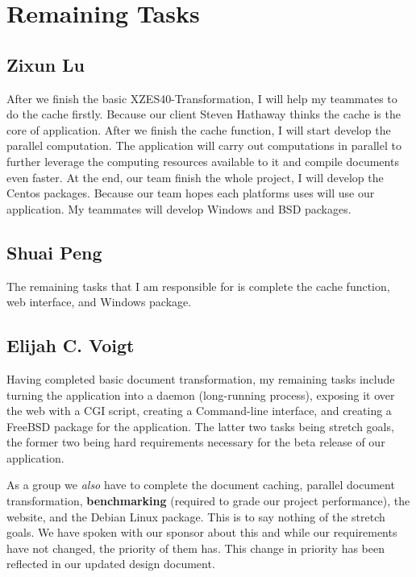 \section{Remaining Tasks}

\subsection{Zixun Lu}

After we finish the basic XZES40-Transformation, I will help my teammates to do the cache firstly. 
Because our client Steven Hathaway thinks the cache is the core of application. 
After we finish the cache function, I will start develop the parallel computation. 
The application will carry out computations in parallel to further leverage the computing resources available to it and compile documents even faster. 
At the end, our team finish the whole project, I will develop the Centos packages.
Because our team hopes each platforms uses will use our application.
My teammates will develop Windows and BSD packages.

\subsection{Shuai Peng}

The remaining tasks that I am responsible for is complete the cache function, web interface, and Windows package.

\subsection{Elijah C. Voigt}

Having completed basic document transformation, my remaining tasks include turning the application into a daemon (long-running process), exposing it over the web with a CGI script, creating a Command-line interface, and creating a FreeBSD package for the application.
The latter two tasks being stretch goals, the former two being hard requirements necessary for the beta release of our application.

As a group we \textit{also} have to complete the document caching, parallel document transformation, \textbf{benchmarking} (required to grade our project performance), the website, and the Debian Linux package.
This is to say nothing of the stretch goals.
We have spoken with our sponsor about this and while our requirements have not changed, the priority of them has.
This change in priority has been reflected in our updated design document.

